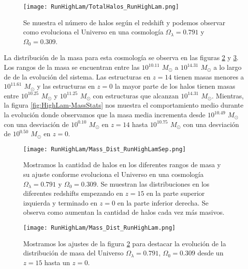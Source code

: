 \begin{figure}[H]
    \centering
    \texttt{[image: RunHighLam/TotalHalos\_RunHighLam.png]}
    \caption[Evolución del número de halos en un Universo $\Omega_\lambda = 0.791$, $\Omega_0 = 0.309$]{\footnotesize Se muestra el número de halos según el redshift y podemos observar como evoluciona el Universo en una cosmología $\Omega_\lambda = 0.791$ y $\Omega_0 = 0.309$.}
    \label{fig:HighLam_TotalHalos}
\end{figure}

La distribución de la masa para esta cosmología se observa en las figuras \ref{fig:HighLam-MassDistSep} y \ref{fig:HighLam-MassDist}. Los rangos de la masa se encuentran entre las $10^{10.11}$ $M_\odot$ a $10^{14.31}$ $M_\odot$ a lo largo de de la evolución del sistema. Las estructuras en $z=14$ tienen masas menores a $10^{11.61}$ $M_\odot$ y las estructuras en $z=0$ la mayor parte de los halos tienen masas entre $10^{10.25}$ $M_\odot$ y $10^{11.25}$ $M_\odot$ con estructuras que alcanzan $10^{14.31}$ $M_\odot$. Mientras, la figura \ref{fig:HighLam-MassStats} nos muestra el comportamiento medio durante la evolución donde observamos que la masa media incrementa desde $10^{10.49}$ $M_\odot$ con una desviación de $10^{0.10}$ $M_\odot$ en $z=14$ hasta $10^{10.75}$ $M_\odot$ con una desviación de $10^{0.50}$ $M_\odot$ en $z=0$.

\begin{figure}[H]
    \centering
    \texttt{[image: RunHighLam/Mass\_Dist\_RunHighLamSep.png]}
    \caption[Distribución de masa]{\footnotesize Mostramos la cantidad de halos en los diferentes rangos de masa y su ajuste conforme evoluciona el Universo en una cosmología $\Omega_\lambda = 0.791$ y $\Omega_0 = 0.309$. Se muestran las distribuciones en los diferentes redshifts empezando en $z=15$ en la parte superior izquierda y terminado en $z=0$ en la parte inferior derecha. Se observa como aumentan la cantidad de halos cada vez más masivos.}
    \label{fig:HighLam-MassDistSep}
\end{figure}

\begin{figure}[H]
    \centering
    \texttt{[image: RunHighLam/Mass\_Dist\_RunHighLam.png]}
    \caption[Comparación de distribución de masa]{\footnotesize Mostramos los ajustes de la figura \ref{fig:HighLam-MassDistSep} para destacar la evolución de la distribución de masa del Universo $\Omega_\lambda = 0.791$, $\Omega_0 = 0.309$ desde un $z=15$ hasta un $z=0$.}
    \label{fig:HighLam-MassDist}
\end{figure}

